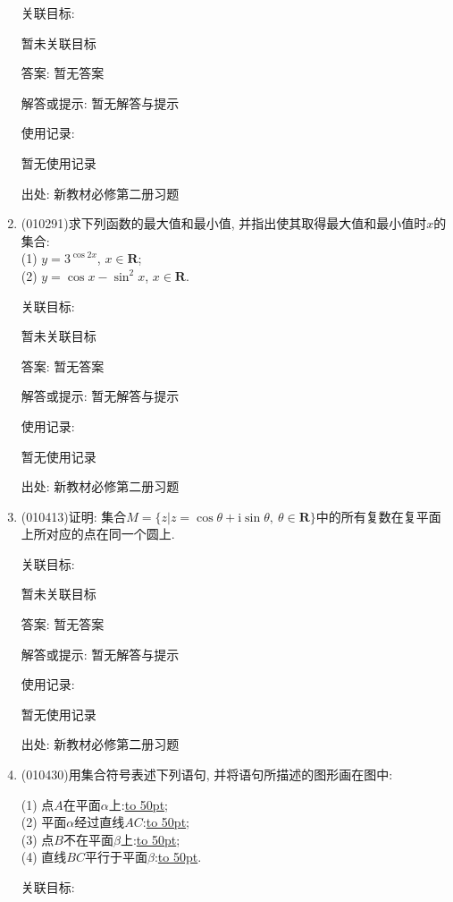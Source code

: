 \documentclass[10pt,a4paper]{article}
\newcommand{\blank}[1]{\underline{\hbox to #1pt{}}}
\begin{document}
\begin{enumerate}[1.]
关联目标:

暂未关联目标

答案: 暂无答案

解答或提示: 暂无解答与提示

使用记录:

暂无使用记录


出处: 新教材必修第二册习题
\item { (010291)}求下列函数的最大值和最小值, 并指出使其取得最大值和最小值时$x$的集合:\\
(1) $y=3^{\cos 2x}$, $x\in \mathbf{R}$;\\
(2) $y=\cos x-\sin^2x$, $x\in \mathbf{R}$.


关联目标:

暂未关联目标

答案: 暂无答案

解答或提示: 暂无解答与提示

使用记录:

暂无使用记录


出处: 新教材必修第二册习题
\item { (010413)}证明: 集合$M=\{z|z=\cos \theta +\mathrm{i}\sin \theta,\ \theta \in \mathbf{R}\}$中的所有复数在复平面上所对应的点在同一个圆上.


关联目标:

暂未关联目标

答案: 暂无答案

解答或提示: 暂无解答与提示

使用记录:

暂无使用记录


出处: 新教材必修第二册习题
\item { (010430)}用集合符号表述下列语句, 并将语句所描述的图形画在图中:\\
\begin{center}
\end{center}
(1) 点$A$在平面$\alpha$上:\blank{50};\\
(2) 平面$\alpha$经过直线$AC$:\blank{50};\\
(3) 点$B$不在平面$\beta$上:\blank{50};\\
(4) 直线$BC$平行于平面$\beta$:\blank{50}.


关联目标:


\end{enumerate}
\end{document}
